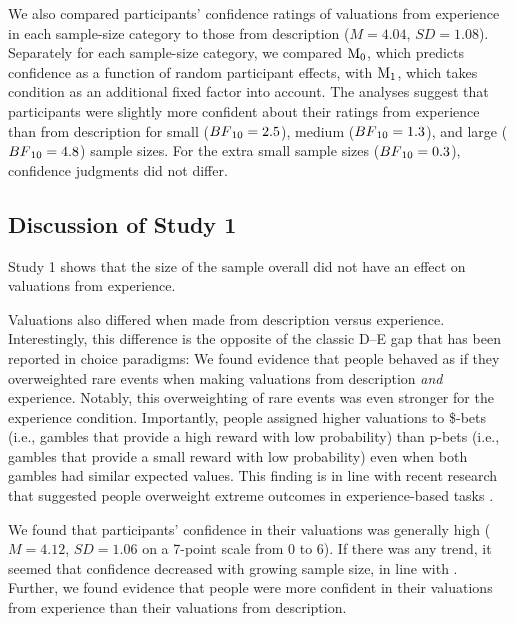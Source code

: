 \documentclass[a4paper, man, natbib, floatsintext]{apa6} %
\begin{document}
We also compared participants' confidence ratings of valuations from experience in each sample-size category to those from description ($M = 4.04$, $SD = 1.08$). Separately for each sample-size category, we compared $\mathrm{M}\textsubscript{0}$, which predicts confidence as a function of random participant effects, with $\mathrm{M}\textsubscript{1}$, which takes condition as an additional fixed factor into account. The analyses suggest that participants were slightly more confident about their ratings from experience than from description for small ($BF\textsubscript{10} = 2.5$), medium ($BF\textsubscript{10} = 1.3$), and large ($BF\textsubscript{10} = 4.8$) sample sizes. For the extra small sample sizes ($BF\textsubscript{10} = 0.3$), confidence judgments did not differ. 


\subsection{Discussion of Study 1}

Study 1 shows that the size of the sample overall did not have an effect on valuations from experience. 

Valuations also differed when made from description versus experience. Interestingly, this difference is the opposite of the classic D--E gap that has been reported in choice paradigms: We found evidence that people behaved as if they overweighted rare events when making valuations from description \textit{and} experience. Notably, this overweighting of rare events was even stronger for the experience condition. Importantly, people assigned higher valuations to \$-bets (i.e., gambles that provide a high reward with low probability) than p-bets (i.e., gambles that provide a small reward with low probability) even when both gambles had similar expected values. This finding is in line with recent research that suggested people overweight extreme outcomes in experience-based tasks \citep{Ludvig2017}.

We found that participants' confidence in their valuations was generally high  ($M = 4.12$, $SD = 1.06$ on a 7-point scale from 0 to 6).  If there was any trend, it seemed that confidence decreased with growing sample size, in line with \cite{Griffin1992}. Further, we found evidence that people were more confident in their valuations from experience than their valuations from description.
\end{document}
